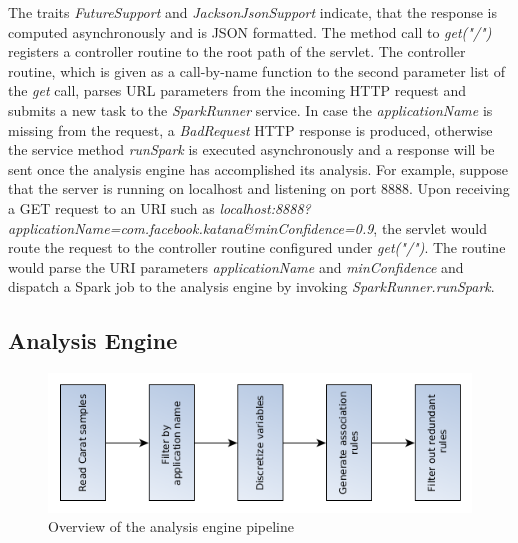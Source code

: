 The traits \textit{FutureSupport} and \textit{JacksonJsonSupport} indicate, that the response is computed asynchronously and is JSON formatted. The method call to \textit{get("/")} registers a controller routine to the root path of the servlet. The controller routine, which is given as a call-by-name function to the second parameter list of the \textit{get} call, parses URL parameters from the incoming HTTP request and submits a new task to the \textit{SparkRunner} service. In case the \textit{applicationName} is missing from the request, a \textit{BadRequest} HTTP response is produced, otherwise the service method \textit{runSpark} is executed asynchronously and a response will be sent once the analysis engine has accomplished its analysis. For example, suppose that the server is running on localhost and listening on port 8888. Upon receiving a GET request to an URI such as \textit{localhost:8888?applicationName=com.facebook.katana\&minConfidence=0.9}, the servlet would route the request to the controller routine configured under \textit{get("/")}. The routine would parse the URI parameters \textit{applicationName} and \textit{minConfidence} and dispatch a Spark job to the analysis engine by invoking \textit{SparkRunner.runSpark}.  



\subsection{Analysis Engine}


\begin{figure}
	\centering
	\includegraphics[width=\textwidth]{images/analysis_engine_flow_graph_vertical.png}
	\caption{Overview of the analysis engine pipeline}
	\label{figure:analysis-engine-flow-graph}
\end{figure}


